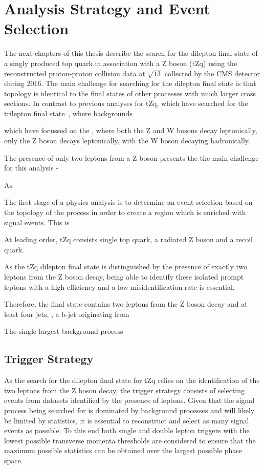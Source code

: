 \chapter{Analysis Strategy and Event Selection}\label{chapter:tzq-search}
The next chapters of this thesis describe the search for the dilepton final state of a singly produced top quark in association with a Z boson (tZq) using the reconstructed proton-proton collision data at $\sqrt{13}$ collected by the CMS detector during 2016.
The main challenge for searching for the dilepton final state is that topology is identical to the final states of other processes with much larger cross sections.
In contrast to previous analyses for tZq, which have searched for the trilepton final state~\cite{Sirunyan:2017kkr,Sirunyan:2017nbr}, where backgrounds



which have focussed on the , where both the Z and W bosons decay leptonically, only the Z boson decays leptonically, with the W boson decaying hadronically.


The presence of only two leptons from a Z boson presents the the main challenge for this analysis - 


As 

The first stage of a	 physics analysis is to determine an event selection based on the topology of the process in order to create a region which is enriched with signal events.
This is 


At leading order, tZq consists single top quark, a radiated Z boson and a recoil quark.

As the tZq dilepton final state is distinguished by the presence of exactly two leptons from the Z boson decay, being able to identify these isolated prompt leptons with a high efficiency and a low misidentification rate is essential.

Therefore, the final state contains two leptons from the Z boson decay and at least four jets, 
, a b-jet originating from 


The single largest background process 


\section{Trigger Strategy}\label{sec:triggerStrategy}
As the search for the dilepton final state for tZq relies on the identification of the two leptons from the Z boson decay, the trigger strategy consists of selecting events from datasets identified by the presence of leptons.
Given that the signal process being searched for is dominated by background processes and will likely be limited by statistics, it is essential to reconstruct and select as many signal events as possible.
To this end both single and double lepton triggers with the lowest possible transverse momenta thresholds are considered 
to ensure that the maximum possible statistics can be obtained over the largest possible phase space.

